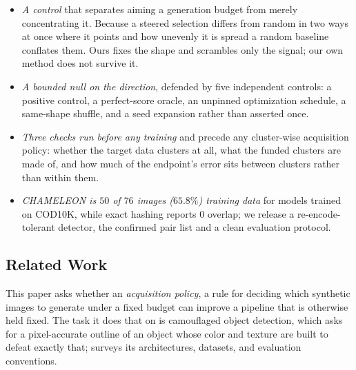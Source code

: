\documentclass{article}
\begin{document}
\begin{itemize}
\item \textit{A control} that separates aiming a generation budget from merely concentrating it. Because a steered selection differs from random in two ways at once where it points and how unevenly it is spread a random baseline conflates them. Ours fixes the shape and scrambles only the signal; our own method does not survive it.
\item \textit{A bounded null on the direction}, defended by five independent controls: a positive
control, a perfect-score oracle, an unpinned optimization schedule, a same-shape shuffle, and a seed
expansion rather than asserted once.
\item \textit{Three checks run before any training} and precede any cluster-wise acquisition
policy: whether the target data clusters at all, what the funded clusters are made of, and how much of the endpoint's error sits between clusters rather than within them.
\item \textit{CHAMELEON is $50$ of $76$ images ($65.8\%$) training data} for models trained on
COD10K, while exact hashing reports $0$ overlap; we release a re-encode-tolerant detector, the
confirmed pair list and a clean evaluation protocol.
\end{itemize}


\subsection{Related Work}
\label{sec:related}
This paper asks whether an \emph{acquisition policy}, a rule for
deciding which synthetic images to generate under a fixed budget can improve a pipeline that is
otherwise held fixed. The task it does that on is camouflaged object detection, which asks for a
pixel-accurate outline of an object whose color and texture are built to defeat exactly that;
\citet{fan2023advances} surveys its architectures, datasets, and evaluation conventions.
\end{document}
